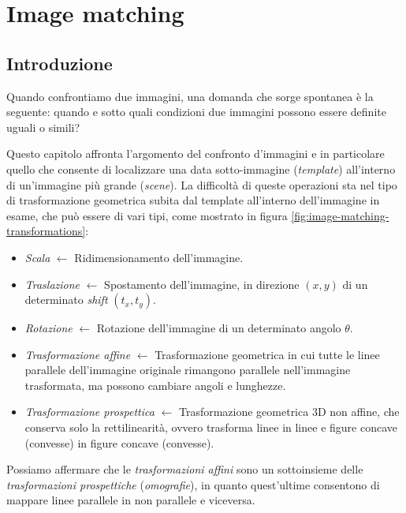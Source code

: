 \chapter{Image matching}
\label{chap:image-matching}


\section{Introduzione}
\label{sec:image-matching-intro}
Quando confrontiamo due immagini, una domanda che sorge spontanea \`e la seguente: quando e sotto quali condizioni due immagini possono essere definite uguali o simili?\par
Questo capitolo affronta l'argomento del confronto d'immagini e in particolare quello che consente di localizzare una data sotto-immagine (\textit{template}) all'interno di un'immagine pi\`u grande (\textit{scene}). La difficolt\`a di queste operazioni sta nel tipo di trasformazione geometrica subita dal template all'interno dell'immagine in esame, che pu\`o essere di vari tipi, come mostrato in figura \ref{fig:image-matching-transformations}:
\begin{itemize}
	\item \textit{Scala} $\gets$ Ridimensionamento dell'immagine.
	\item \textit{Traslazione} $\gets$ Spostamento dell'immagine, in direzione $(x, y)$ di un determinato \textit{shift} $(t_{x}, t_{y})$.
	\item \textit{Rotazione} $\gets$ Rotazione dell'immagine di un determinato angolo $\theta$.
	\item \textit{Trasformazione affine} $\gets$ Trasformazione geometrica in cui tutte le linee parallele dell'immagine originale rimangono parallele nell'immagine trasformata, ma possono cambiare angoli e lunghezze.
	\item \textit{Trasformazione prospettica} $\gets$ Trasformazione geometrica 3D non affine, che conserva solo la rettilinearit\`a, ovvero trasforma linee in linee e figure concave (convesse) in figure concave (convesse).
\end{itemize}
Possiamo affermare che le \textit{trasformazioni affini} sono un sottoinsieme delle \textit{trasformazioni prospettiche} (\textit{omografie}), in quanto quest'ultime consentono di mappare linee parallele in non parallele e viceversa.\par
\pgfplotsset{compat=1.9}
